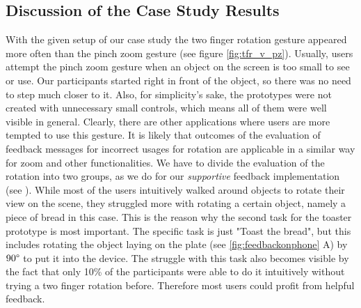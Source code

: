\documentclass[11pt, a4paper]{article}
\begin{document}
		\subsection*{Discussion of the Case Study Results}\label{ssec:discussion}
			With the given setup of our case study the two finger rotation gesture appeared more often than the pinch zoom gesture (see figure \ref{fig:tfr_v_pz}). Usually, users attempt the pinch zoom gesture when an object on the screen is too small to see or use. Our participants started right in front of the object, so there was no need to step much closer to it. Also, for simplicity's sake, the prototypes were not created with unnecessary small controls, which means all of them were well visible in general. Clearly, there are other applications where users are more tempted to use this gesture. It is likely that outcomes of the evaluation of feedback messages for incorrect usages for rotation are applicable in a similar way for zoom and other functionalities. We have to divide the evaluation of the rotation into two groups, as we do for our \emph{supportive} feedback implementation (see ). While most of the users intuitively walked around objects to rotate their view on the scene, they struggled more with rotating a certain object, namely a piece of bread in this case. This is the reason why the second task for the toaster prototype is most important. The specific task is just "Toast the bread", but this includes rotating the object laying on the plate (see \ref{fig:feedbackonphone} A) by $90\degree$ to put it into the device. The struggle with this task also becomes visible by the fact that only 10\% of the participants were able to do it intuitively without trying a two finger rotation before. Therefore most users could profit from helpful feedback.
\end{document}
